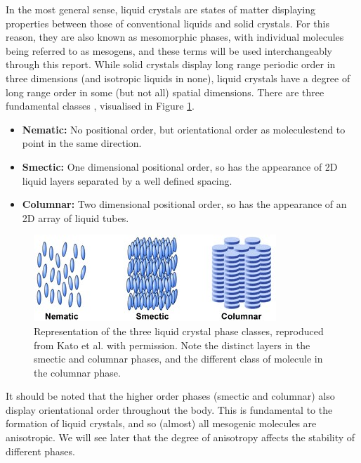 \documentclass[11pt, a4paper]{article} %
\providecommand{\DIFadd}[1]{{\protect\color{blue}\uwave{#1}}} %
\providecommand{\DIFaddbegin}{} %
\providecommand{\DIFaddend}{} %
\begin{document}
In the most general sense, liquid crystals are states of matter displaying properties between those of conventional liquids and solid crystals. For this reason, they are also known as mesomorphic phases, with individual molecules being referred to as mesogens, and these terms will be used interchangeably through this report. While solid crystals display long range periodic order in three dimensions (and isotropic liquids in none), liquid crystals have a degree of long range order in some (but not all) spatial dimensions. There are three fundamental classes \cite{DeGennes1993}, visualised in Figure \ref{fig:lcphasescropped}.

\begin{itemize}
	\item \textbf{Nematic:} No positional order, but orientational order as molecules\DIFaddbegin \footnotemark \DIFadd{\ }\DIFaddend tend to point in the same direction.
	\item \textbf{Smectic:} One dimensional positional order, so has the appearance of 2D liquid layers separated by a well defined spacing.
	\item \textbf{Columnar:} Two dimensional positional order, so has the appearance of an 2D array of liquid tubes.
\end{itemize}


\begin{figure} [ht!]
	\centering
	\includegraphics[width=0.7\linewidth]{Figures/lc_phases_cropped}
	\caption{Representation of the three liquid crystal phase classes, reproduced from Kato et al. \cite{Kato2007} with permission. Note the distinct layers in the smectic and columnar phases, and the different class of molecule in the columnar phase.}
	\label{fig:lcphasescropped}
\end{figure}


It should be noted that the higher order phases (smectic and columnar) also display orientational order throughout the body. This is fundamental to the formation of liquid crystals, and so (almost) all mesogenic molecules are anisotropic. We will see later that the degree of anisotropy affects the stability of different phases. 
\end{document}

